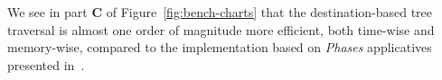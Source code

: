 \documentclass[english]{jflart}
\begin{document}
We see in part \textbf{C} of Figure~\ref{fig:bench-charts} that the destination-based tree traversal is almost one order of magnitude more efficient, both time-wise and memory-wise, compared to the implementation based on \emph{Phases} applicatives presented in~\cite{gibbons_phases_2023}.







\end{document}

